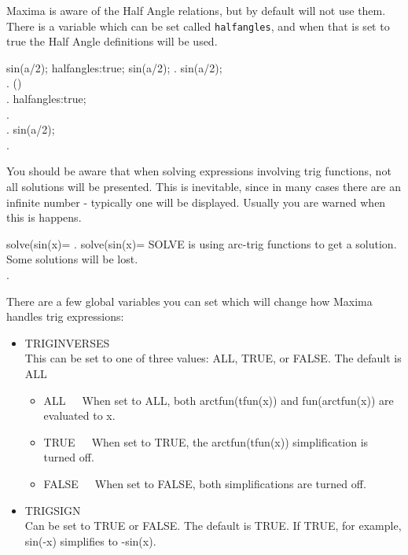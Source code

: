 Maxima is aware of the Half Angle relations, but by default will not use
them.  There is a variable which can be set called \texttt{halfangles}, and when
that is set to true the Half Angle definitions will be used.

\beginmaximasession
sin(a/2);
halfangles:true;
sin(a/2);
\maximatexsession
{}.  sin(a/2); \\
.  \sin \left(\right) \\
.  halfangles:true; \\
.   \\
.  sin(a/2); \\
.   \\
\endmaximasession

You should be aware that when solving expressions 
involving trig functions, not all solutions will be presented.  This
is inevitable, since in many cases there are an infinite number - 
typically one will be displayed.  Usually you are warned when this
is happens.

\beginmaximasession
solve(sin(x)=%
\maximatexsession
{}.  solve(sin(x)=%
\p
SOLVE is using arc-trig functions to get a solution.
Some solutions will be lost. \\
.  \left[ x=\arcsin \left(\frac{\pi}{2}\right) \right] \\
\endmaximasession

There are a few global variables you can set which will change how
Maxima handles trig expressions:

\begin{itemize}
\item TRIGINVERSES \\
      This can be set to one of three values:  ALL, TRUE, or FALSE. The
      default is ALL
      \begin{itemize}
       \item ALL~~~When set to ALL, both arctfun(tfun(x)) and
            fun(arctfun(x)) are evaluated to x.
       \item TRUE~~~When set to TRUE, the arctfun(tfun(x)) simplification
             is turned off.
       \item FALSE~~~When set to FALSE, both simplifications are turned
             off.
      \end{itemize}
\item TRIGSIGN \\
      Can be set to TRUE or FALSE.  The default is TRUE.  If TRUE,
      for example, sin(-x) simplifies to -sin(x).
\end{itemize}

